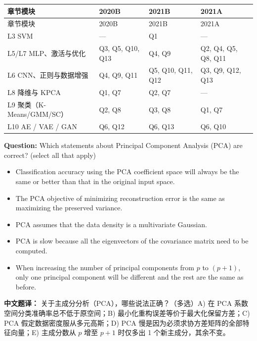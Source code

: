 \begingroup\small\setlength{\tabcolsep}{3pt}\renewcommand{\arraystretch}{1.22}
\begin{longtable}{@{}>{\raggedright\arraybackslash}p{}>{\raggedright\arraybackslash}p{}>{\raggedright\arraybackslash}p{}>{\raggedright\arraybackslash}p{}@{}}
\toprule
章节模块 & 2020B & 2021B & 2021A \\
\midrule\endfirsthead
章节模块 & 2020B & 2021B & 2021A \\
\midrule\endhead
\bottomrule\endfoot
L3 SVM & — & Q1 & — \\
L5/L7 MLP、激活与优化 & Q3, Q5, Q10, Q13 & Q4, Q9 & Q2, Q4, Q5, Q8, Q11 \\
L6 CNN、正则与数据增强 & Q4, Q9, Q11 & Q5, Q10, Q11, Q12 & Q3, Q9, Q12, Q13 \\
L8 降维与 KPCA & Q1, Q7 & Q2, Q7 & — \\
L9 聚类（K-Means/GMM/SC） & Q2, Q8 & Q3, Q8 & Q1, Q7 \\
L10 AE / VAE / GAN & Q6, Q12 & Q6, Q13 & Q6, Q10 \\
\end{longtable}\endgroup




\textbf{Question:} Which statements about Principal Component Analysis (PCA) are correct? (select all that apply)
\begin{itemize}
\item[A)] Classification accuracy using the PCA coefficient space will always be the same or better than that in the original input space.
\item[B)] The PCA objective of minimizing reconstruction error is the same as maximizing the preserved variance.
\item[C)] PCA assumes that the data density is a multivariate Gaussian.
\item[D)] PCA is slow because all the eigenvectors of the covariance matrix need to be computed.
\item[E)] When increasing the number of principal components from $p$ to $(p+1)$, only one principal component will be different and the rest are the same as before.
\end{itemize}
\textbf{中文题译：} 关于主成分分析（PCA），哪些说法正确？（多选）A) 在 PCA 系数空间分类准确率总不低于原空间；B) 最小化重构误差等价于最大化保留方差；C) PCA 假定数据密度服从多元高斯；D) PCA 慢是因为必须求协方差矩阵的全部特征向量；E) 主成分数从 $p$ 增至 $p+1$ 时仅多出 1 个新主成分，其余不变。

